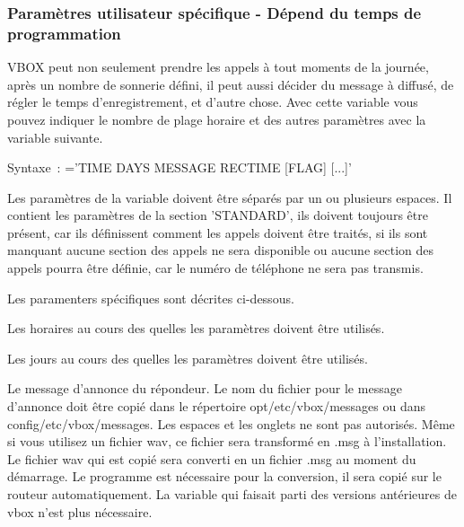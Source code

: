 \subsubsection{Paramètres utilisateur spécifique - Dépend du temps de programmation}

\begin{description}


    VBOX peut non seulement prendre les appels à tout moments de la journée, après un nombre de
	sonnerie défini, il peut aussi décider du message à diffusé, de régler le temps d'enregistrement,
	et d'autre chose. Avec cette variable vous pouvez indiquer le nombre de plage horaire et des
	autres paramètres avec la variable suivante.


    Syntaxe~: ='TIME DAYS MESSAGE RECTIME [FLAG] [...]'

    Les paramètres de la variable  doivent être séparés par
	un ou plusieurs espaces. Il contient les paramètres de la section 'STANDARD', ils doivent
	toujours être présent, car ils définissent comment les appels doivent être traités, si ils sont
	manquant aucune section des appels ne sera disponible ou aucune section des appels pourra
	être définie, car le numéro de téléphone ne sera pas transmis.

    Les paramenters spécifiques sont décrites ci-dessous.



    Les horaires au cours des quelles les paramètres doivent être utilisés.



    Les jours au cours des quelles les paramètres doivent être utilisés.



    Le message d'annonce du répondeur. Le nom du fichier pour le message d'annonce doit être
	copié dans le répertoire opt/etc/vbox/messages ou dans config/etc/vbox/messages. Les espaces
	et les onglets ne sont pas autorisés. Même si vous utilisez un fichier wav, ce fichier sera
	transformé en .msg à l'installation. Le fichier wav qui est copié sera converti en un fichier
	.msg au moment du démarrage. Le programme  est nécessaire pour la conversion,
	il sera copié sur le routeur automatiquement. La variable  qui faisait
	parti des versions antérieures de vbox n'est plus nécessaire.



\end{description}
